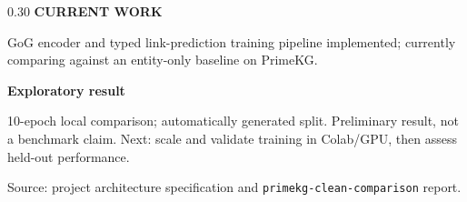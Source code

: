 \documentclass[aspectratio=169]{beamer}
\begin{document}
\begin{frame}[t]
\begin{columns}[T,onlytextwidth]
\begin{column}{0.30\textwidth}
\vspace{0.02cm}
{\color{teal}\bfseries CURRENT WORK}\par
\vspace{0.08cm}
{\small GoG encoder and typed link-prediction training pipeline implemented; currently comparing against an entity-only baseline on PrimeKG.}\par
\vspace{0.18cm}
{\color{navy}\bfseries Exploratory result}\par
\vspace{0.06cm}
\vspace{0.12cm}
{\scriptsize\color{ink}10-epoch local comparison; automatically generated split. Preliminary result, not a benchmark claim. Next: scale and validate training in Colab/GPU, then assess held-out performance.}\par
\vfill
{\tiny Source: project architecture specification and \texttt{primekg-clean-comparison} report.}
\end{column}
\end{columns}
\end{frame}
\end{document}
